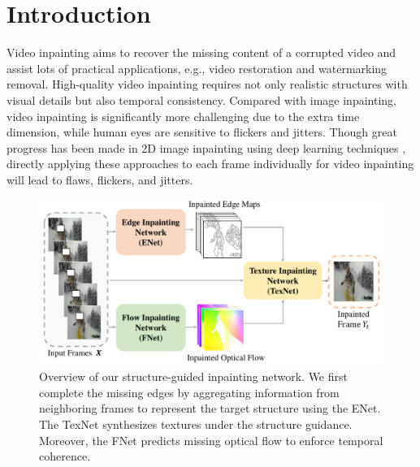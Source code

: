 

\section{Introduction}


Video inpainting aims to recover the missing content of a corrupted video and assist lots of practical applications, e.g., video restoration and watermarking removal. 
High-quality video inpainting requires not only realistic structures with visual details but also temporal consistency. 
Compared with image inpainting, video inpainting is significantly more challenging due to the extra time dimension, while human eyes are sensitive to flickers and jitters.
% 
Though great progress has been made in 2D image inpainting using deep learning techniques \cite{yu2018free,Xiong_2019_CVPR}, directly applying these approaches to each frame individually for video inpainting will lead to flaws, flickers, and jitters. 

\begin{figure}[t]
	\centering
	\includegraphics[width=1.0\columnwidth]{zong} %
	\caption{Overview of our structure-guided inpainting network. We first complete the missing edges by aggregating information from neighboring frames to represent the target structure using the ENet. The TexNet synthesizes textures under the structure guidance. Moreover, the FNet predicts missing optical flow to enforce temporal coherence.}
	\label{zong}
\end{figure}


